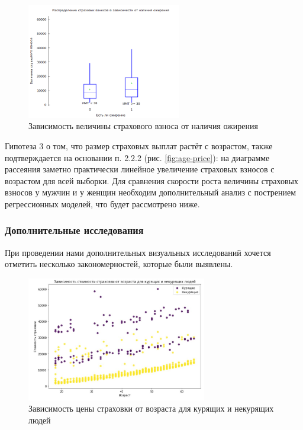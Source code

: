 \documentclass[a4paper,12pt]{article}
\begin{document}
\begin{figure}[H]
	\includegraphics[width=0.6\textwidth]{../[graphics]/is_fat.png}
	\centering
	\caption{Зависимость величины страхового взноса от наличия ожирения}
	\label{fig:is_fat}
\end{figure}

Гипотеза 3 о том, что размер страховых выплат растёт с возрастом, также подтверждается на основании п. 2.2.2 (рис. \ref{fig:age-price}): на диаграмме рассеяния заметно практически линейное увеличение страховых взносов с возрастом для всей выборки. Для сравнения скорости роста величины страховых взносов у мужчин и у женщин необходим дополнительный анализ с пострением регрессионных моделей, что будет рассмотрено ниже.

\subsubsection{Дополнительные исследования}

При проведении нами дополнительных визуальных исследований хочется отметить несколько закономерностей, которые были выявлены.

\begin{figure}[H]
	\includegraphics[width=0.7\textwidth]{../[graphics]/age-charges-smoker.jpg}
	\centering
	\caption{Зависимость цены страховки от возраста для курящих и некурящих людей}
	\label{fig:age-charges-smoker}
\end{figure}
\end{document}
